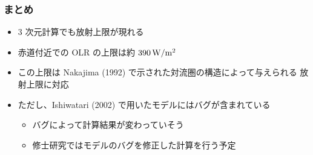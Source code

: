 \documentclass[aspectratio=149,9pt,fleqn]{beamer}
\begin{document}
\begin{frame}
	\frametitle{まとめ}
	\begin{itemize}
		\item 3 次元計算でも放射上限が現れる
		\item 赤道付近での OLR の上限は約 \(390\hmu{W/m^2}\)
		\item この上限は Nakajima \etal (1992) で示された対流圏の構造によって与えられる
			放射上限に対応
		\item ただし、Ishiwatari \etal (2002) で用いたモデルにはバグが含まれている
			\begin{itemize}
				\item バグによって計算結果が変わっていそう
				\item 修士研究ではモデルのバグを修正した計算を行う予定
			\end{itemize}
	\end{itemize}
\end{frame}
\end{document}
